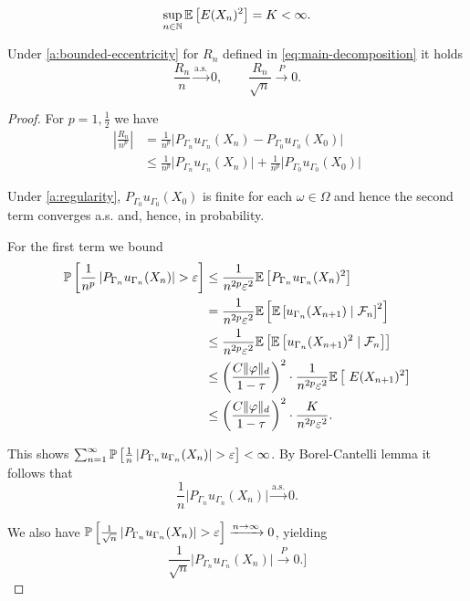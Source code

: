 \begin{assumption}
\label{a:bounded-eccentricity}
    \[
    \sup_{n \in \mathbb{N}} \mathbb{E} \left[ E(X_n)^2 \right] = K < \infty.
    \]
\end{assumption}
\begin{lemma}
    Under \ref{a:bounded-eccentricity} for $R_n$ defined in \eqref{eq:main-decomposition} it holds
\[
    \frac{R_n}{n} \xrightarrow{\text{a.s.}} 0, \qquad \frac{R_n}{\sqrt{n}} \xrightarrow{P} 0.
\]
\begin{proof}
    For $p = 1, \frac{1}{2}$ we have
    \begin{align*}
        \left\vert\frac{R_n}{n^p}\right\vert
        &=\frac{1}{n^p}\big|P_{\Gamma_{n}}u_{\Gamma_{n}}(X_{n})- P_{\Gamma_0}u_{\Gamma_0}(X_0)\big| \\
        &\leq \frac{1}{n^p}\big|P_{\Gamma_{n}}u_{\Gamma_{n}}(X_{n})\big| + 
        \frac{1}{n^p}\big| P_{\Gamma_0}u_{\Gamma_0}(X_0)\big| 
    \end{align*}

Under \ref{a:regularity}, $P_{\Gamma_0}u_{\Gamma_0}(X_0)$ is finite for each $\omega \in \Omega $ and hence the second term converges a.s. and, hence, in probability.

For the first term we bound
\begin{align*}
    \mathbb{P} \left[ \frac{1}{n^p} \left\vert P_{\Gamma_n}u_{\Gamma_n}(X_n) \right\vert > \varepsilon \right]
    &\leq \frac{1}{n^{2p} \varepsilon^2} \mathbb{E} \left[ P_{\Gamma_n}u_{\Gamma_n}(X_n)^2 \right] \\
    &= \frac{1}{n^{2p} \varepsilon^2} \mathbb{E} \left[ \mathbb{E} \left[  u_{\Gamma_n}(X_{n+1}) \mid \mathcal{F}_n  \right]^2 \right] \\
    &\leq \frac{1}{n^{2p} \varepsilon^2} \mathbb{E} \left[ \mathbb{E} \left[  u_{\Gamma_n}(X_{n+1})^2 \mid \mathcal{F}_n  \right] \right] \\
    &\leq \left( \frac{C \| \varphi \|_d}{1 - \tau} \right)^2 \cdot \frac{1}{n^{2p} \varepsilon^2} \mathbb{E} \left[ \ E(X_{n+1})^2  \right] \\
    &\leq \left( \frac{C \| \varphi \|_d}{1 - \tau} \right)^2 \cdot \frac{K}{n^{2p} \varepsilon^2} .
\end{align*}

    This shows $\sum_{n=1}^{\infty}  \mathbb{P} \left[ \frac{1}{n} \left\vert P_{\Gamma_n}u_{\Gamma_n}(X_n) \right\vert > \varepsilon \right] < \infty$. By Borel-Cantelli lemma it follows that 
  \[
  \frac{1}{n}\big|P_{\Gamma_{n}}u_{\Gamma_{n}}(X_{n})\big| \xrightarrow{\text{a.s.}} 0.
  \]

  We also have $\mathbb{P} \left[ \frac{1}{\sqrt{n}} \left\vert P_{\Gamma_n}u_{\Gamma_n}(X_n) \right\vert > \varepsilon \right]\xrightarrow{n \to \infty} 0$, yielding
  \[
  \frac{1}{\sqrt{n}}\big|P_{\Gamma_{n}}u_{\Gamma_{n}}(X_{n})\big| \xrightarrow{P} 0.]
  \]


\end{proof}
\end{lemma}
